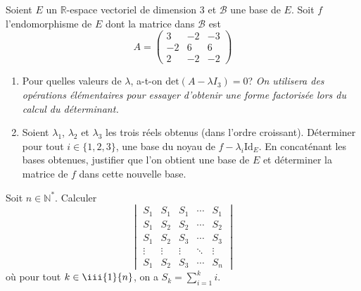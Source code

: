 \documentclass[a4paper,twoside,french,10pt]{VcCours}
\begin{document}
\medskip

\begin{Exercice}{}\end{Exercice} Soient $E$ un $\mathbb{R}$-espace vectoriel de dimension 3 et $\mathcal{B}$ une base de $E$. Soit $f$ l'endomorphisme de $E$ dont la matrice dans $\mathcal{B}$ est
  \[
  A =
  \begin{pmatrix}
    3 &  - 2 &  - 3 \\
    - 2 & 6 & 6 \\
    2 &  - 2 &  - 2
  \end{pmatrix}
  \]
  \begin{enumerate}
  \item Pour quelles valeurs de $\lambda$, a-t-on $\textrm{det} ( A - \lambda I_{3} ) = 0$? \textit{On utilisera des opérations élémentaires pour essayer d'obtenir une forme factorisée lors du calcul du déterminant.}
  \item Soient $\lambda_1$, $\lambda_2$ et $\lambda_3$ les trois réels obtenus (dans l'ordre croissant). Déterminer pour tout $i \in \lbrace 1,2,3 \rbrace$, une base du noyau de $f -\lambda_i \textrm{Id}_E$. En concaténant les bases obtenues, justifier que l'on obtient une base de $E$ et déterminer la matrice de $f$ dans cette nouvelle base.
  \end{enumerate}

\medskip

\begin{Exercice}{}\end{Exercice} Soit $n \in \mathbb{N}^{*}$. Calculer
  \[
  \begin{vmatrix}
    S_{1} & S_{1} & S_{1} & \cdots & S_{1} \\
    S_{1} & S_{2} & S_{2} & \cdots & S_{2} \\
    S_{1} & S_{2} & S_{3} & \cdots & S_{3} \\
    \vdots & \vdots & \vdots & \ddots & \vdots \\
    S_{1} & S_{2} & S_{3} & \cdots & S_{n}
  \end{vmatrix}
  \]
  où pour tout $ k \in \iii{1}{n}$, on a $ S_{k} = \sum_{i = 1}^{k} i $.
\end{document}
